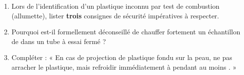 \documentclass[11pt]{article}
\begin{document}
\begin{exercice}
\begin{enumerate}
    \item Lors de l'identification d'un plastique inconnu par test de combustion (allumette), lister \textbf{trois} consignes de sécurité impératives à respecter.
    \item Pourquoi est-il formellement déconseillé de chauffer fortement un échantillon de  dans un tube à essai fermé ?
    \item Compléter : « En cas de projection de plastique fondu sur la peau, ne pas arracher le plastique, mais refroidir immédiatement à \underline{\hspace{4cm}} pendant au moins \underline{\hspace{2cm}}. »
\end{enumerate}
\end{exercice}
\end{document}
